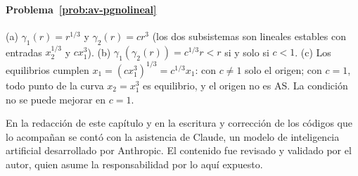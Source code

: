 \paragraph{Problema~\ref{prob:av-pgnolineal}}
(a) $\gamma_1(r)=r^{1/3}$ y $\gamma_2(r)=cr^3$ (los dos subsistemas son lineales estables con entradas $x_2^{1/3}$ y $cx_1^3$). (b) $\gamma_1(\gamma_2(r))=c^{1/3}r<r$ si y solo si $c<1$. (c) Los equilibrios cumplen $x_1=(cx_1^3)^{1/3}=c^{1/3}x_1$: con $c\neq1$ solo el origen; con $c=1$, todo punto de la curva $x_2=x_1^3$ es equilibrio, y el origen no es AS. La condición no se puede mejorar en $c=1$.

\respuestaspausas

\begin{parallevar}
En la redacción de este capítulo y en la escritura y corrección de los códigos que lo acompañan se contó con la asistencia de Claude, un modelo de inteligencia artificial desarrollado por Anthropic. El contenido fue revisado y validado por el autor, quien asume la responsabilidad por lo aquí expuesto.
\end{parallevar}
